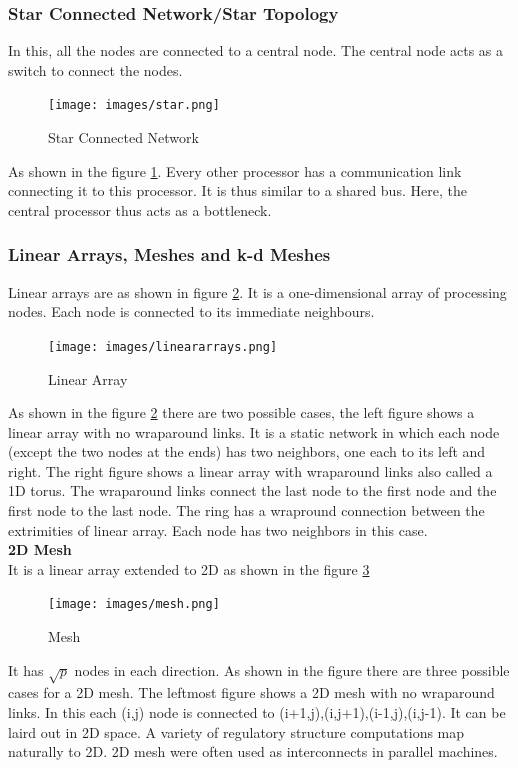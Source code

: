 \documentclass[12pt]{article}
\begin{document}
\subsubsection{Star Connected Network/Star Topology}
In this, all the nodes are connected to a central node. The central node acts as a switch to connect the nodes.
\begin{figure}[H]
    \centering
    \texttt{[image: images/star.png]}
    \caption{Star Connected Network}
    \label{fig:star}
\end{figure}
As shown in the figure \ref{fig:star}. Every other processor has a communication link connecting it to this processor. It is thus similar to 
a shared bus. Here, the central processor thus acts as a bottleneck.

\subsubsection{Linear Arrays, Meshes and k-d Meshes}
Linear arrays are as shown in figure \ref{fig:linear}. It is a one-dimensional array of processing nodes. Each node is connected to its immediate neighbours.
\begin{figure}[H]
    \centering
    \texttt{[image: images/lineararrays.png]}
    \caption{Linear Array}
    \label{fig:linear}
\end{figure}
As shown in the figure \ref{fig:linear} there are two possible cases, the left figure shows a linear array with no wraparound links. It is a 
static network in which each node (except the two nodes at the ends) has two neighbors, one each to its left and right.
The right figure shows a linear array with wraparound links also called a 1D torus. The wraparound links connect the last node to the first node and the first node to the last node.
The ring has a wrapround connection between the extrimities of linear array. Each node has two neighbors in this case.\\
\textbf{2D Mesh}\\
It is a linear array extended to 2D as shown in the figure \ref{fig:2dmesh}
\begin{figure}[H]
    \centering
    \texttt{[image: images/mesh.png]}
    \caption{Mesh}
    \label{fig:2dmesh}
\end{figure}
It has $\sqrt{p}$ nodes in each direction. As shown in the figure there are three possible cases for a 2D mesh.
The leftmost figure shows a 2D mesh with no wraparound links. In this each (i,j) node is connected to (i+1,j),(i,j+1),(i-1,j),(i,j-1).
It can be laird out in 2D space. A variety of regulatory structure computations map naturally to 2D. 2D mesh were often used as interconnects in parallel machines.\\
\end{document}
